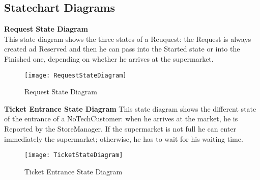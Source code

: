 \subsection{Statechart Diagrams}


\textbf{Request State Diagram} \\
This state diagram shows the three states of a Reuquest: the Request is always created ad Reserved and then he can pass into the Started state or into the Finished one, depending on whether he arrives at the supermarket.

\begin{figure}[H] 
\centerline{\texttt{[image: RequestStateDiagram]}}
\caption{Request State Diagram}
\end{figure}



\textbf{Ticket Entrance State Diagram}
This state diagram shows the different state of the entrance of a NoTechCustomer: when he arrives at the market, he is Reported by the StoreManager. If the supermarket is not full he can enter immediately the supermarket; otherwise, he has to wait for his waiting time.
\begin{figure}[H] 
\centerline{\texttt{[image: TicketStateDiagram]}}
\caption{Ticket Entrance State Diagram}
\end{figure}
 



 
 